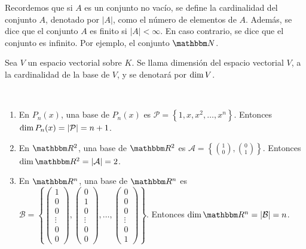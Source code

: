 \begin{remark}
    Recordemos que si $A$ es un conjunto no vacío, se define la cardinalidad del conjunto $A$, denotado por $|A|$, como el número de elementos de $A$. Además, se dice que el conjunto $A$ es finito si $|A| < \infty$. En caso contrario, se dice que el conjunto es infinito. Por ejemplo, el conjunto $\NN$.
\end{remark}

\begin{definition}
    Sea $V$ un espacio vectorial sobre $K$. Se llama dimensión del espacio vectorial $V$, a la cardinalidad de la base de $V$, y se denotará por $\operatorname{dim} V$.
\end{definition}

\begin{examples}~
    \begin{enumerate}
        \item En $P_n(x)$, una base de $P_n(x)$ es $\mathcal{P} = \left\{ 1, x, x^2, \dots, x^n \right\}$. Entonces $\operatorname{dim} P_n(x) = |\mathcal{P}| = n+1$.
        \item En $\RR[2]$, una base de $\RR[2]$ es $\displaystyle \mathcal{A} = \left\{ \binom{1}{0},  \binom{0}{1} \right\}$. Entonces $\Dim \RR[2] = |\mathcal{A}| = 2$.
        \item En $\RR[n]$, una base de $\RR[n]$ es $\displaystyle \mathcal{B} = \left\{ \left( \begin{array}{c} 1 \\ 0 \\ 0 \\ \vdots \\ 0 \\ 0 \end{array} \right),  \left( \begin{array}{c} 0 \\ 1 \\ 0 \\ \vdots \\ 0 \\ 0 \end{array} \right),  \dots,  \left( \begin{array}{c} 0 \\ 0 \\ 0 \\ \vdots \\ 0 \\ 1 \end{array} \right) \right\}$. Entonces $\Dim \RR[n] = |\mathcal{B}| = n$.
    \end{enumerate}
\end{examples}

